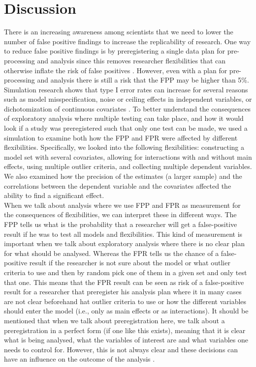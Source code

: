 \section{Discussion}
There is an increasing awareness among scientists that we need to  lower the number of false positive findings to increase the replicability of research. One way to reduce false positive findings is by preregistering a single data plan for pre-processing and analysis since this removes researcher flexibilities that can otherwise inflate the risk of false positives \citep{Simmons2018}. However, even with a plan for pre-processing and analysis there is still a risk that the FPP may be higher than 5\%. Simulation research shows that type I error rates can increase for several reasons such as model misspecification, noise or ceiling effects in independent variables, or dichotomization of continuous covariates \citep{Dennis2019, Litiere2007, Brunner2009, Austin2003, Austin2004}. To better understand the consequences of exploratory analysis where multiple testing can take place, and how it would look if a study was preregistered such that only one test can be made, we used a simulation to examine both how the FPP and FPR were affected by different flexibilities. Specifically, we looked into the following flexibilities: constructing a model set with several covariates, allowing for interactions with and without main effects, using multiple outlier criteria, and collecting multiple dependent variables. We also examined how the precision of the estimates (a larger sample) and the correlations between the dependent variable and the covariates affected the ability to find a significant effect. \\

When we talk about analysis where we use FPP and FPR as measurement for the consequences of flexibilities, we can interpret these in different ways. The FPP tells us what is the probability that a researcher will get a false-positive result if he was to test all models and flexibilities. This kind of measurement is important when we talk about exploratory analysis where there is no clear plan for what should be analysed. Whereas the FPR tells us the chance of a false-positive result if the researcher is not sure about the model or what outlier criteria to use and then by random pick one of them in a given set and only test that one. This means that the FPR result can be seen as risk of a  false-positive result for a researcher that preregister his analysis plan where it in many cases are not clear beforehand hat outlier criteria to use or how the different variables should enter the model (i.e., only as main effects or as interactions).
It should be mentioned that when we talk about preregistration here, we talk about a preregistration in a perfect form (if one like this exists), meaning that it is clear what is being analysed, what the variables of interest are and what variables one needs to control for. However, this is not always clear and these decisions can have an influence on the outcome of the analysis \citep{Bryan25535,gilbert2016comment}.\\ 


